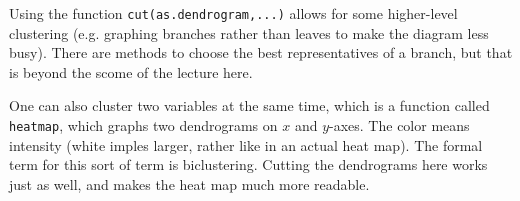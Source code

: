Using the function \texttt{cut(as.dendrogram,...)} allows for some higher-level clustering (e.g. graphing branches rather than leaves to make the diagram less busy). There are methods to choose the best representatives of a branch, but that is beyond the scome of the lecture here.

One can also cluster two variables at the same time, which is a function called \texttt{heatmap}, which graphs two dendrograms on $x$ and $y$-axes. The color means intensity (white imples larger, rather like in an actual heat map). The formal term for this sort of term is biclustering. Cutting the dendrograms here works just as well, and makes the heat map much more readable.
